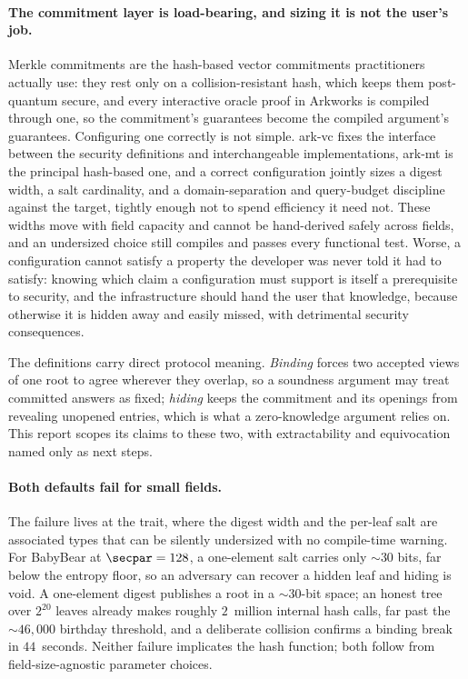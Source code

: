 \label{sec:motivation}

\paragraph{The commitment layer is load-bearing, and sizing it is not the
user's job.}
Merkle commitments are the hash-based vector commitments practitioners actually
use: they rest only on a collision-resistant hash, which keeps them post-quantum
secure, and every interactive oracle proof in \textsf{Arkworks} is compiled
through one, so the commitment's guarantees become the compiled argument's
guarantees.  Configuring one correctly is not simple.  \textsf{ark-vc} fixes the
interface between the security definitions and interchangeable implementations,
\textsf{ark-mt} is the principal hash-based one, and a correct configuration
jointly sizes a digest width, a salt cardinality, and a domain-separation and
query-budget discipline against the target, tightly enough not to spend
efficiency it need not.  These widths move with field capacity and cannot be
hand-derived safely across fields, and an undersized choice still compiles and
passes every functional test.  Worse, a configuration cannot satisfy a property
the developer was never told it had to satisfy: knowing which claim a
configuration must support is itself a prerequisite to security, and the
infrastructure should hand the user that knowledge, because otherwise it is
hidden away and easily missed, with detrimental security consequences.

The definitions carry direct protocol meaning.  \emph{Binding} forces two
accepted views of one root to agree wherever they overlap, so a soundness
argument may treat committed answers as fixed; \emph{hiding} keeps the commitment
and its openings from revealing unopened entries, which is what a zero-knowledge
argument relies on.  This report scopes its claims to these two, with
extractability and equivocation named only as next steps.

\paragraph{Both defaults fail for small fields.}
The failure lives at the  trait, where the digest width and
the per-leaf salt are associated types that can be silently undersized with no
compile-time warning.  For BabyBear at $\secpar=128$, a one-element salt carries
only ${\sim}30$ bits, far below the entropy floor, so an adversary can recover a
hidden leaf and hiding is void.  A one-element digest publishes a root in a
${\sim}30$-bit space; an honest tree over $2^{20}$ leaves already makes roughly
$2$~million internal hash calls, far past the ${\sim}46{,}000$ birthday
threshold, and a deliberate collision confirms a binding break in $44$~seconds.
Neither failure implicates the hash function; both follow from
field-size-agnostic parameter choices.

